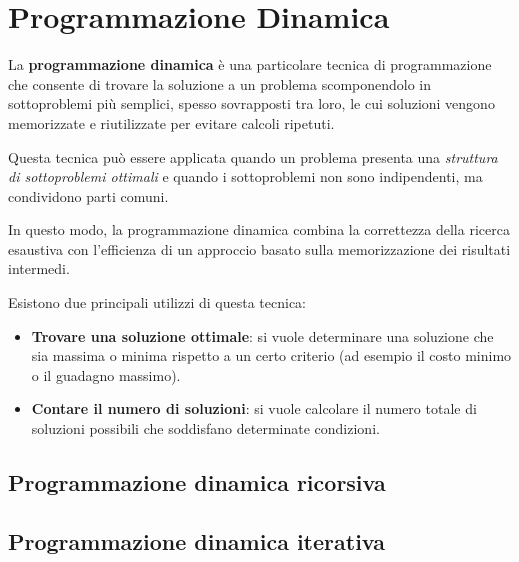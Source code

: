 
\chapter{Programmazione Dinamica}

La \textbf{programmazione dinamica} è una particolare tecnica di programmazione che consente di trovare la soluzione a un problema scomponendolo in sottoproblemi più semplici, spesso sovrapposti tra loro, le cui soluzioni vengono memorizzate e riutilizzate per evitare calcoli ripetuti.

Questa tecnica può essere applicata quando un problema presenta una \textit{struttura di sottoproblemi ottimali} e quando i sottoproblemi non sono indipendenti, ma condividono parti comuni.

In questo modo, la programmazione dinamica combina la correttezza della ricerca esaustiva con l’efficienza di un approccio basato sulla memorizzazione dei risultati intermedi.

Esistono due principali utilizzi di questa tecnica:
\begin{itemize}
	\item \textbf{Trovare una soluzione ottimale}: si vuole determinare una soluzione che sia massima o minima rispetto a un certo criterio (ad esempio il costo minimo o il guadagno massimo).
	\item \textbf{Contare il numero di soluzioni}: si vuole calcolare il numero totale di soluzioni possibili che soddisfano determinate condizioni.
\end{itemize}


\section{Programmazione dinamica ricorsiva}

\section{Programmazione dinamica iterativa}